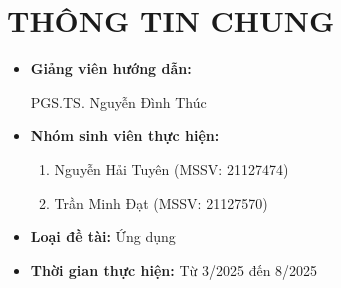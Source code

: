 \documentclass{article}[14pt]
\begin{document}
    \vspace{.5cm}
    
    \Large
    \section{THÔNG TIN CHUNG}
    \begin{itemize}[label = {}]
        
        \item \textbf{Giảng viên hướng dẫn:} 
        \begin{itemize}
            PGS.TS. Nguyễn Đình Thúc
        \end{itemize}{}
    
        
        \item \textbf{Nhóm sinh viên thực hiện:}
        
        \begin{enumerate}
            \item Nguyễn Hải Tuyên (MSSV: 21127474) 
            \item Trần Minh Đạt (MSSV: 21127570)
        \end{enumerate}

        \item \textbf{Loại đề tài:} Ứng dụng
        
        \item \textbf{Thời gian thực hiện:} Từ 3/2025 đến 8/2025
        
        
    \end{itemize}
    
    \pagebreak 
    
\end{document}

